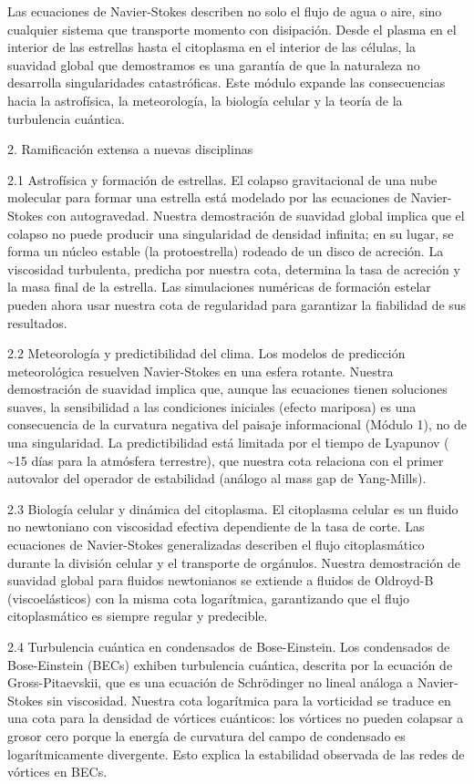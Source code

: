 \documentclass[12pt,a4paper]{book}
\begin{document}
Las ecuaciones de Navier-Stokes describen no solo el flujo de agua o aire, sino cualquier sistema que transporte momento con disipación. Desde el plasma en el interior de las estrellas hasta el citoplasma en el interior de las células, la suavidad global que demostramos es una garantía de que la naturaleza no desarrolla singularidades catastróficas. Este módulo expande las consecuencias hacia la astrofísica, la meteorología, la biología celular y la teoría de la turbulencia cuántica.

2. Ramificación extensa a nuevas disciplinas

2.1 Astrofísica y formación de estrellas.
El colapso gravitacional de una nube molecular para formar una estrella está modelado por las ecuaciones de Navier-Stokes con autogravedad. Nuestra demostración de suavidad global implica que el colapso no puede producir una singularidad de densidad infinita; en su lugar, se forma un núcleo estable (la protoestrella) rodeado de un disco de acreción. La viscosidad turbulenta, predicha por nuestra cota, determina la tasa de acreción y la masa final de la estrella. Las simulaciones numéricas de formación estelar pueden ahora usar nuestra cota de regularidad para garantizar la fiabilidad de sus resultados.

2.2 Meteorología y predictibilidad del clima.
Los modelos de predicción meteorológica resuelven Navier-Stokes en una esfera rotante. Nuestra demostración de suavidad implica que, aunque las ecuaciones tienen soluciones suaves, la sensibilidad a las condiciones iniciales (efecto mariposa) es una consecuencia de la curvatura negativa del paisaje informacional (Módulo 1), no de una singularidad. La predictibilidad está limitada por el tiempo de Lyapunov ( \sim 15 días para la atmósfera terrestre), que nuestra cota relaciona con el primer autovalor del operador de estabilidad (análogo al mass gap de Yang-Mills).

2.3 Biología celular y dinámica del citoplasma.
El citoplasma celular es un fluido no newtoniano con viscosidad efectiva dependiente de la tasa de corte. Las ecuaciones de Navier-Stokes generalizadas describen el flujo citoplasmático durante la división celular y el transporte de orgánulos. Nuestra demostración de suavidad global para fluidos newtonianos se extiende a fluidos de Oldroyd-B (viscoelásticos) con la misma cota logarítmica, garantizando que el flujo citoplasmático es siempre regular y predecible.

2.4 Turbulencia cuántica en condensados de Bose-Einstein.
Los condensados de Bose-Einstein (BECs) exhiben turbulencia cuántica, descrita por la ecuación de Gross-Pitaevskii, que es una ecuación de Schrödinger no lineal análoga a Navier-Stokes sin viscosidad. Nuestra cota logarítmica para la vorticidad se traduce en una cota para la densidad de vórtices cuánticos: los vórtices no pueden colapsar a grosor cero porque la energía de curvatura del campo de condensado es logarítmicamente divergente. Esto explica la estabilidad observada de las redes de vórtices en BECs.
\end{document}
